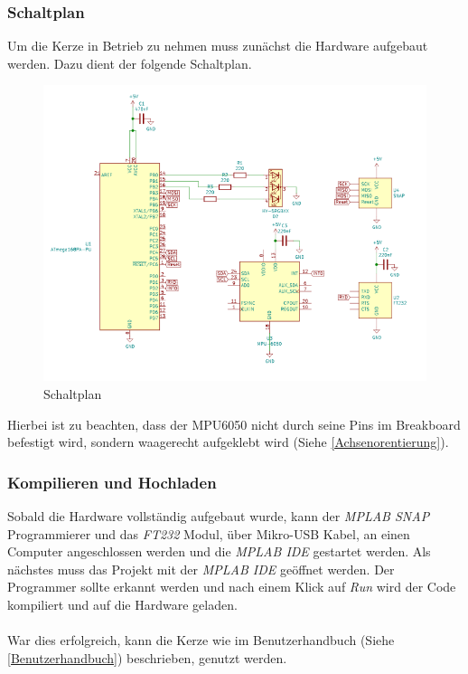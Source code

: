         \subsubsection{Schaltplan}\label{schaltplan}
            Um die Kerze in Betrieb zu nehmen muss zunächst die
            Hardware aufgebaut werden. Dazu dient der folgende Schaltplan.
            \begin{figure}[H]
                \centering
                \includegraphics[scale=0.6]{img/schaltplan.png}
                \caption{Schaltplan}
            \end{figure}
            Hierbei ist zu beachten, dass der MPU6050 nicht durch seine Pins im
            Breakboard befestigt wird, sondern waagerecht aufgeklebt wird
            (Siehe \ref{Achsenorentierung}).

        \subsubsection{Kompilieren und Hochladen}
            Sobald die Hardware vollständig aufgebaut wurde, kann der
            \textit{MPLAB SNAP} Programmierer und das \textit{FT232} Modul,
            über Mikro-USB Kabel, an einen Computer angeschlossen werden und die
            \textit{MPLAB IDE} gestartet werden.
            Als nächstes muss das Projekt mit der \textit{MPLAB IDE} geöffnet werden.
            Der Programmer sollte erkannt werden und nach einem Klick auf
            \textit{Run} wird der Code kompiliert und auf die Hardware geladen.
            \\\\
            War dies erfolgreich, kann die Kerze wie im
            Benutzerhandbuch (Siehe \ref{Benutzerhandbuch}) beschrieben, genutzt
            werden.
